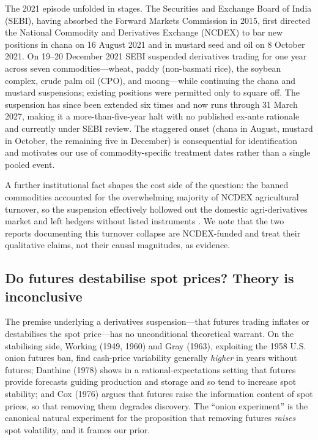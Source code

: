 The 2021 episode unfolded in stages. The Securities and Exchange Board of India
(SEBI), having absorbed the Forward Markets Commission in 2015, first directed the
National Commodity and Derivatives Exchange (NCDEX) to bar new positions in chana on
16 August 2021 and in mustard seed and oil on 8 October 2021. On 19--20 December 2021
SEBI suspended derivatives trading for one year across seven commodities---wheat,
paddy (non-basmati rice), the soybean complex, crude palm oil (CPO), and
moong---while continuing the chana and mustard suspensions; existing positions were
permitted only to square off. The suspension has since been extended six times and
now runs through 31 March 2027, making it a more-than-five-year halt with no published
ex-ante rationale and currently under SEBI review. The staggered onset (chana in
August, mustard in October, the remaining five in December) is consequential for
identification and motivates our use of commodity-specific treatment dates rather
than a single pooled event.

A further institutional fact shapes the cost side of the question: the banned
commodities accounted for the overwhelming majority of NCDEX agricultural turnover,
so the suspension effectively hollowed out the domestic agri-derivatives market and
left hedgers without listed instruments \citep{Rajib2024, PwC2023}. We note that the
two reports documenting this turnover collapse are NCDEX-funded and treat their
qualitative claims, not their causal magnitudes, as evidence.

\subsection{Do futures destabilise spot prices? Theory is inconclusive}
\label{sec:background-theory}

The premise underlying a derivatives suspension---that futures trading inflates or
destabilises the spot price---has no unconditional theoretical warrant. On the
stabilising side, Working (1949, 1960) and Gray (1963), exploiting the 1958 U.S.
onion futures ban, find cash-price variability generally \emph{higher} in years
without futures; Danthine (1978) shows in a rational-expectations setting that
futures provide forecasts guiding production and storage and so tend to increase spot
stability; and Cox (1976) argues that futures raise the information content of spot
prices, so that removing them degrades discovery. The ``onion experiment'' is the
canonical natural experiment for the proposition that removing futures \emph{raises}
spot volatility, and it frames our prior.

